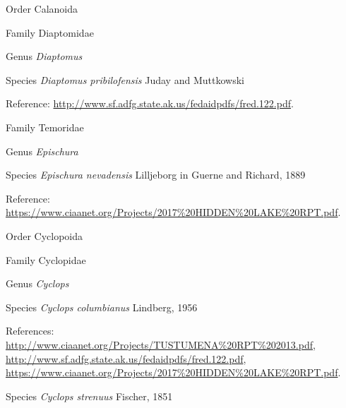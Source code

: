 \documentclass[9pt, article]{memoir}
\begin{document}
\begin{multicols}{2}
\vspace{6pt}\noindent\hspace{18pt}Order Calanoida


\vspace{6pt}\noindent\hspace{24pt}Family Diaptomidae


\vspace{6pt}\noindent\hspace{30pt}Genus \textit{Diaptomus}


\vspace{6pt}\noindent\hspace{36pt}Species \textit{Diaptomus pribilofensis} Juday and Muttkowski


Reference: 
\url{http://www.sf.adfg.state.ak.us/fedaidpdfs/fred.122.pdf}.

\vspace{6pt}\noindent\hspace{24pt}Family Temoridae


\vspace{6pt}\noindent\hspace{30pt}Genus \textit{Epischura}


\vspace{6pt}\noindent\hspace{36pt}Species \textit{Epischura nevadensis} Lilljeborg in Guerne and Richard, 1889


Reference: 
\url{https://www.ciaanet.org/Projects/2017%20HIDDEN%20LAKE%20RPT.pdf}.

\vspace{6pt}\noindent\hspace{18pt}Order Cyclopoida


\vspace{6pt}\noindent\hspace{24pt}Family Cyclopidae


\vspace{6pt}\noindent\hspace{30pt}Genus \textit{Cyclops}


\vspace{6pt}\noindent\hspace{36pt}Species \textit{Cyclops columbianus} Lindberg, 1956


References: 
\url{http://www.ciaanet.org/Projects/TUSTUMENA%20RPT%202013.pdf}, 
\url{http://www.sf.adfg.state.ak.us/fedaidpdfs/fred.122.pdf}, 
\url{https://www.ciaanet.org/Projects/2017%20HIDDEN%20LAKE%20RPT.pdf}.

\vspace{6pt}\noindent\hspace{36pt}Species \textit{Cyclops strenuus} Fischer, 1851



\end{multicols}
\end{document}
